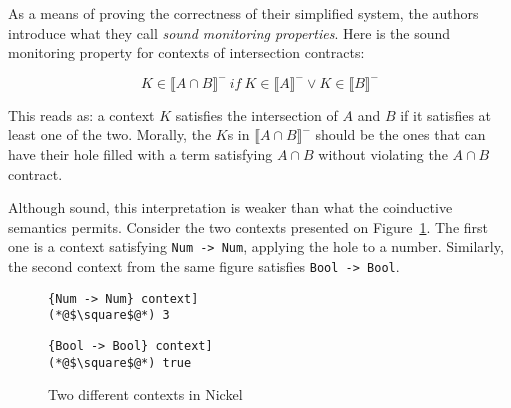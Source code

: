 \documentclass[sigplan,screen,10pt]{acmart}
\newcommand{\nickel}[1]{\lstinline[language=nickel]{#1}}
\begin{document}

As a means of proving the correctness of their simplified system, the
authors introduce what they call \emph{sound monitoring
  properties}. Here is the sound monitoring property for contexts of
intersection contracts:

$$ K \in \llbracket A \cap B \rrbracket^-~if~K \in \llbracket A \rrbracket^- \lor K \in \llbracket B \rrbracket^- $$

This reads as: a context $K$ satisfies the intersection of $A$ and $B$ if it
satisfies at least one of the two. Morally, the $K$s in $\llbracket A \cap B
\rrbracket^-$  should be the ones that can have their hole filled with a term
satisfying $A \cap B$ without violating the $A \cap B$ contract.

Although sound, this interpretation is weaker than what the
coinductive semantics permits. Consider the two contexts presented on
Figure~\ref{fig:valid-contexts}. The first one is a context satisfying
\nickel{Num -> Num}, applying the hole to a number. Similarly, the second context
from the same figure satisfies \nickel{Bool -> Bool}.

\begin{figure}[h]
\begin{lstlisting}[language=nickel, title=\nickel{Num -> Num} context]
(*@$\square$@*) 3
\end{lstlisting}
\begin{lstlisting}[language=nickel, title=\nickel{Bool -> Bool} context]
(*@$\square$@*) true
\end{lstlisting}
\caption{Two different contexts in Nickel}
\label{fig:valid-contexts}
\end{figure}
\end{document}
